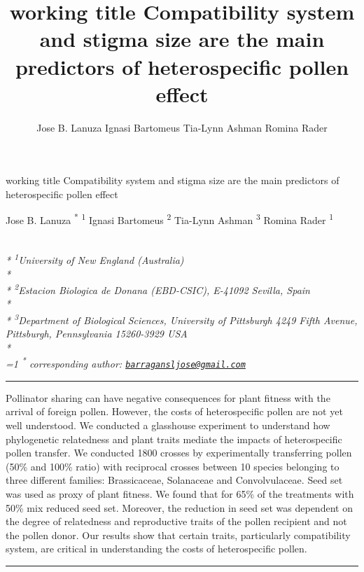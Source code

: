 \documentclass[11pt,a4paper]{article}
\title{working title Compatibility system and stigma size are the main
predictors of heterospecific pollen effect}
\author{
Jose B. Lanuza
Ignasi Bartomeus
Tia-Lynn Ashman
Romina Rader
}
\date{}
\begin{document}
\begin{singlespace}
\begin{center}
\huge working title Compatibility system and stigma size are the main
predictors of heterospecific pollen effect
\end{center}
\begin{center}
\large
Jose B. Lanuza \textsuperscript{*} \textsuperscript{1} 
Ignasi Bartomeus \textsuperscript{2} 
Tia-Lynn Ashman \textsuperscript{3} 
Romina Rader \textsuperscript{1} 
\end{center}
\begin{justify}
\footnotesize \emph{ 
\\*
\textsuperscript{1}University of New England (Australia)\\*
\\*
\textsuperscript{2}Estacion Biologica de Donana (EBD-CSIC), E-41092 Sevilla, Spain\\*
\\*
\textsuperscript{3}Department of Biological Sciences, University of Pittsburgh 4249 Fifth
Avenue, Pittsburgh, Pennsylvania 15260-3929 USA\\*
}
\setcounter{num}{1}
\\[0.1cm]
\footnotesize \emph{ 
\ifnum\value{num}=1%
\textsuperscript{*} corresponding author:
\fi
\href{mailto:barragansljose@gmail.com}{\nolinkurl{barragansljose@gmail.com}}
}
\end{justify}
\normalsize

\end{singlespace}


\singlespace

\vspace{2mm}\hrule

Pollinator sharing can have negative consequences for plant fitness with
the arrival of foreign pollen. However, the costs of heterospecific
pollen are not yet well understood. We conducted a glasshouse experiment
to understand how phylogenetic relatedness and plant traits mediate the
impacts of heterospecific pollen transfer. We conducted 1800 crosses by
experimentally transferring pollen (50\% and 100\% ratio) with
reciprocal crosses between 10 species belonging to three different
families: Brassicaceae, Solanaceae and Convolvulaceae. Seed set was used
as proxy of plant fitness. We found that for 65\% of the treatments with
50\% mix reduced seed set. Moreover, the reduction in seed set was
dependent on the degree of relatedness and reproductive traits of the
pollen recipient and not the pollen donor. Our results show that certain
traits, particularly compatibility system, are critical in understanding
the costs of heterospecific pollen. \vspace{3mm}\hrule
\end{document}
